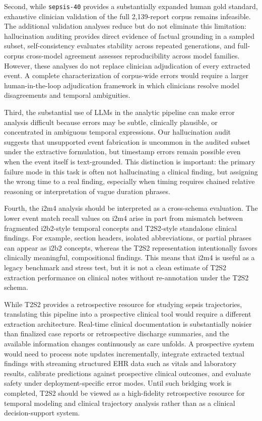 Second, while \texttt{sepsis-40} provides a substantially expanded human gold standard, exhaustive clinician validation of the full 2,139-report corpus remains infeasible.
The additional validation analyses reduce but do not eliminate this limitation: hallucination auditing provides direct evidence of factual grounding in a sampled subset, self-consistency evaluates stability across repeated generations, and full-corpus cross-model agreement assesses reproducibility across model families.
However, these analyses do not replace clinician adjudication of every extracted event.
A complete characterization of corpus-wide errors would require a larger human-in-the-loop adjudication framework in which clinicians resolve model disagreements and temporal ambiguities.

Third, the substantial use of LLMs in the analytic pipeline can make error analysis difficult because errors may be subtle, clinically plausible, or concentrated in ambiguous temporal expressions.
Our hallucination audit suggests that unsupported event fabrication is uncommon in the audited subset under the extractive formulation, but timestamp errors remain possible even when the event itself is text-grounded.
This distinction is important: the primary failure mode in this task is often not hallucinating a clinical finding, but assigning the wrong time to a real finding, especially when timing requires chained relative reasoning or interpretation of vague duration phrases.

Fourth, the i2m4 analysis should be interpreted as a cross-schema evaluation.
The lower event match recall values on i2m4 arise in part from mismatch between fragmented i2b2-style temporal concepts and T2S2-style standalone clinical findings.
For example, section headers, isolated abbreviations, or partial phrases can appear as i2b2 concepts, whereas the T2S2 representation intentionally favors clinically meaningful, compositional findings.
This means that i2m4 is useful as a legacy benchmark and stress test, but it is not a clean estimate of T2S2 extraction performance on clinical notes without re-annotation under the T2S2 schema.

While T2S2 provides a retrospective resource for studying sepsis trajectories, translating this pipeline into a prospective clinical tool would require a different extraction architecture.
Real-time clinical documentation is substantially noisier than finalized case reports or retrospective discharge summaries, and the available information changes continuously as care unfolds.
A prospective system would need to process note updates incrementally, integrate extracted textual findings with streaming structured EHR data such as vitals and laboratory results, calibrate predictions against prospective clinical outcomes, and evaluate safety under deployment-specific error modes.
Until such bridging work is completed, T2S2 should be viewed as a high-fidelity retrospective resource for temporal modeling and clinical trajectory analysis rather than as a clinical decision-support system.

